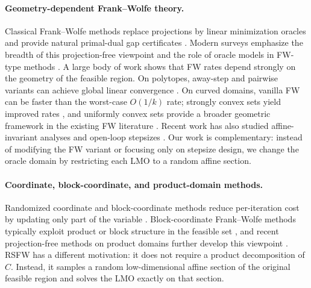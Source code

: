 \documentclass{article}
\begin{document}
\paragraph{Geometry-dependent Frank--Wolfe theory.}
Classical Frank--Wolfe methods replace projections by linear minimization
oracles and provide natural primal-dual gap certificates
\cite{FrankWolfe1956,Jaggi2013FW}. Modern surveys emphasize the breadth of this
projection-free viewpoint and the role of oracle models in FW-type methods
\cite{BomzeRinaldiZeffiro2024FWFriends}. A large body of work shows that FW
rates depend strongly on the geometry of the feasible region. On polytopes,
away-step and pairwise variants can achieve global linear convergence
\cite{LacosteJulienJaggi2015FWLinear}. On curved domains, vanilla FW can be
faster than the worst-case \(O(1/k)\) rate; strongly convex sets yield improved
rates \cite{GarberHazan2015FW}, and uniformly convex sets provide a broader
geometric framework in the existing FW literature
\cite{KerdreuxDAspremontPokutta2021UniformConvexFW}. Recent work has also
studied affine-invariant analyses and open-loop stepsizes
\cite{KerdreuxLiuLacosteJulienScieur2021Affine,WirthKerdreuxPokutta2023OpenLoop,WirthPenaPokutta2025OpenLoop}.
Our work is complementary: instead of modifying the FW variant or focusing only
on stepsize design, we change the oracle domain by restricting each LMO to a
random affine section.

\paragraph{Coordinate, block-coordinate, and product-domain methods.}
Randomized coordinate and block-coordinate methods reduce per-iteration cost by
updating only part of the variable
\cite{Nesterov2012CoordinateDescent,RichtarikTakac2014RBCD}. Block-coordinate
Frank--Wolfe methods typically exploit product or block structure in the
feasible set \cite{LacosteJulienJaggiSchmidtPletscher2013BlockCoordinateFW},
and recent projection-free methods on product domains further develop this
viewpoint \cite{BomzeRinaldiZeffiro2025ProductDomains}. RSFW has a different
motivation: it does not require a product decomposition of \(C\). Instead, it
samples a random low-dimensional affine section of the original feasible region
and solves the LMO exactly on that section.
\end{document}
